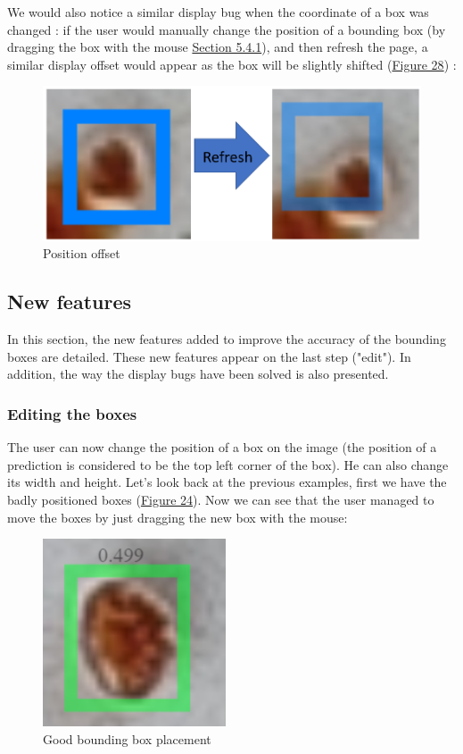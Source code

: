 \documentclass{article}
\begin{document}
We would also notice a similar display bug when the coordinate of a box was changed : if the user would manually change the position of a bounding box (by dragging the box with the mouse \hyperref[Section 5.4.1]{Section 5.4.1}), and then refresh the page, a similar display offset would appear as the box will be slightly shifted (\hyperref[Figure 28]{Figure 28}) : 

\begin{figure}[!ht]
  \centering
  \includegraphics[scale=0.8]{limitation/offset.PNG}
  \caption{Position offset}
  \label{Figure 28}
\end{figure}


\subsection{New features}
In this section, the new features added to improve the accuracy of the bounding boxes are detailed.
These new features appear on the last step ("edit"). In addition, the way the display bugs have been solved is also presented.


\subsubsection{Editing the boxes}
\label{Section 5.4.1}

The user can now change the position of a box on the image (the position of a prediction is considered to be the top left corner of the box). He can also change its width and height. Let's look back at the previous examples, first we have the badly positioned boxes (\hyperref[Figure 24]{Figure 24}). Now we can see that the user managed to move the boxes by just dragging the new box with the mouse:

\begin{figure}[!ht]
  \centering
  \includegraphics[scale=0.9]{features/coordinates.PNG}
  \caption{Good bounding box placement}
  \label{Figure 28}
\end{figure}
\end{document}

